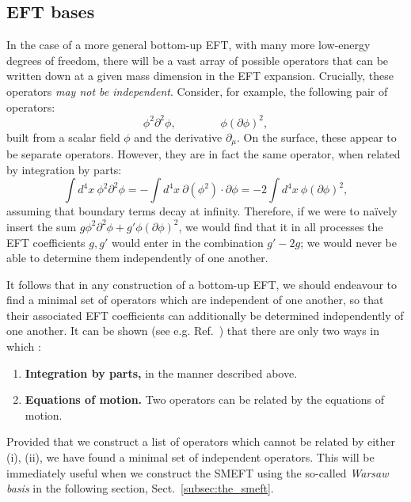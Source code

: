 \documentclass[withindex,glossary]{cam-thesis}
\begin{document}
\subsection{EFT bases}
\label{subsec:eft_bases}
In the case of a more general bottom-up EFT, with many more low-energy degrees of freedom, there will be a vast array of possible operators that can be written down at a given mass dimension in the EFT expansion. Crucially, these operators \textit{may not be independent}. Consider, for example, the following pair of operators:
\begin{equation}
\phi^2 \partial^2 \phi, \qquad \qquad \phi (\partial\phi)^2,
\end{equation}
built from a scalar field $\phi$ and the derivative $\partial_{\mu}$. On the surface, these appear to be separate operators. However, they are in fact the same operator, when related by integration by parts:
\begin{equation}
\int d^4x\ \phi^2 \partial^2 \phi = -\int d^4x\ \partial(\phi^2) \cdot \partial \phi = -2 \int d^4x\ \phi (\partial \phi)^2,
\end{equation}
assuming that boundary terms decay at infinity. Therefore, if we were to na\"{i}vely insert the sum $g \phi^2 \partial^2 \phi + g' \phi (\partial \phi)^2$, we would find that it in all processes the EFT coefficients $g, g'$ would enter in the combination $g' - 2g$; we would never be able to determine them independently of one another.

It follows that in any construction of a bottom-up EFT, we should endeavour to find a minimal set of operators which are independent of one another, so that their associated EFT coefficients can additionally be determined independently of one another. It can be shown (see e.g. Ref.~\cite{}) that there are only two ways in which :
\begin{enumerate}[label = (\roman*)]
\item \textbf{Integration by parts,} in the manner described above.
\item \textbf{Equations of motion.} Two operators can be related by the equations of motion.
\end{enumerate}
Provided that we construct a list of operators which cannot be related by either (i), (ii), we have found a minimal set of independent operators. This will be immediately useful when we construct the SMEFT using the so-called \textit{Warsaw basis} in the following section, Sect.~\ref{subsec:the_smeft}.
\end{document}
